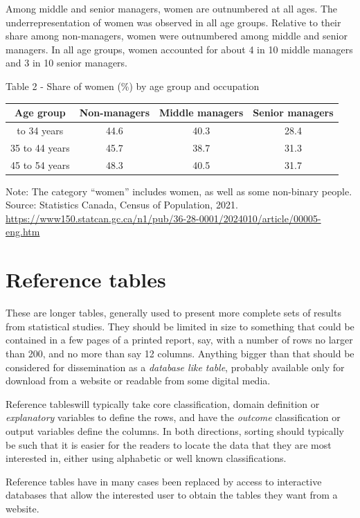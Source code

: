 \documentclass[
  12pt,
]{book}
\begin{document}
Among middle and senior managers, women are outnumbered at all ages. The underrepresentation of women was observed in all age groups. Relative to their share among non-managers, women were outnumbered among middle and senior managers. In all age groups, women accounted for about 4 in 10 middle managers and 3 in 10 senior managers.

Table 2 - Share of women (\%) by age group and occupation

\begin{longtable}[]{@{}cccc@{}}
\toprule\noalign{}
Age group & Non-managers & Middle managers & Senior managers \\
\midrule\noalign{}
\endhead
\bottomrule\noalign{}
\endlastfoot
25 to 34 years & 44.6 & 40.3 & 28.4 \\
35 to 44 years & 45.7 & 38.7 & 31.3 \\
45 to 54 years & 48.3 & 40.5 & 31.7 \\
\end{longtable}

Note: The category ``women'' includes women, as well as some non-binary people. Source: Statistics Canada, Census of Population, 2021. \url{https://www150.statcan.gc.ca/n1/pub/36-28-0001/2024010/article/00005-eng.htm}

\section{Reference tables}\label{reference-tables}

These are longer tables, generally used to present more complete sets of results from statistical studies. They should be limited in size to something that could be contained in a few pages of a printed report, say, with a number of rows no larger than 200, and no more than say 12 columns. Anything bigger than that should be considered for dissemination as a \emph{database like table}, probably available only for download from a website or readable from some digital media.

Reference tableswill typically take core classification, domain definition or \emph{explanatory} variables to define the rows, and have the \emph{outcome} classification or output variables define the columns. In both directions, sorting should typically be such that it is easier for the readers to locate the data that they are most interested in, either using alphabetic or well known classifications.

Reference tables have in many cases been replaced by access to interactive databases that allow the interested user to obtain the tables they want from a website.
\end{document}
